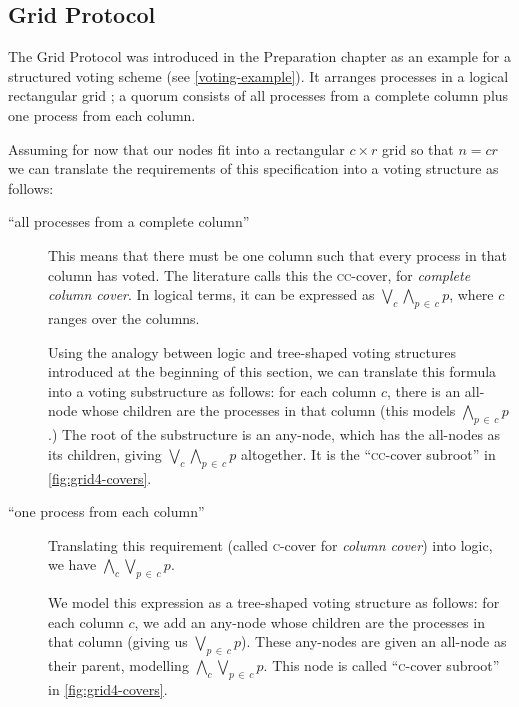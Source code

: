 \documentclass[11pt,chapterprefix=true,toc=bibliography,numbers=noendperiod,
               footnotes=multiple,twoside]{scrreprt}
\begin{document}
\subsection{Grid Protocol\label{ssc:grid}}

The Grid Protocol was introduced in the Preparation chapter as an example for a structured voting scheme (see \cref{voting-example}). It arranges processes in a logical rectangular grid \autocite{grid}; a quorum consists of all processes from a complete column plus one process from each column.

Assuming for now that our nodes fit into a rectangular \(c \times r\) grid so that \(n = c r\) we can translate the requirements of this specification into a voting structure as follows:

\begin{description}
    \item[\enquote{all processes from a complete column}] This means that there must be one column such that every process in that column has voted. The literature calls this the \textsc{cc}-cover, for \emph{complete column cover}. In logical terms, it can be expressed as \(\bigvee_c \bigwedge_{p\,\in\,c} p \), where \(c\) ranges over the columns.

        Using the analogy between logic and tree-shaped voting structures introduced at the beginning of this section, we can translate this formula into a voting substructure as follows: for each column \(c\), there is an all-node whose children are the processes in that column (this models \(\bigwedge_{p\,\in\,c} p \).) The root of the substructure is an any-node, which has the all-nodes as its children, giving \(\bigvee_c \bigwedge_{p\,\in\,c} p \) altogether. It is the \enquote{\textsc{cc}-cover subroot} in \cref{fig:grid4-covers}.

    \item[\enquote{one process from each column}] Translating this requirement (called \textsc{c}-cover for \emph{column cover}) into logic, we have \(\bigwedge_c \bigvee_{p\,\in\,c} p \).

        We model this expression as a tree-shaped voting structure as follows: for each column \(c\), we add an any-node whose children are the processes in that column (giving us \(\bigvee_{p\,\in\,c} p \)). These any-nodes are given an all-node as their parent, modelling \(\bigwedge_c \bigvee_{p\,\in\,c} p \). This node is called \enquote{\textsc{c}-cover subroot} in \cref{fig:grid4-covers}.
\end{description}
\end{document}
